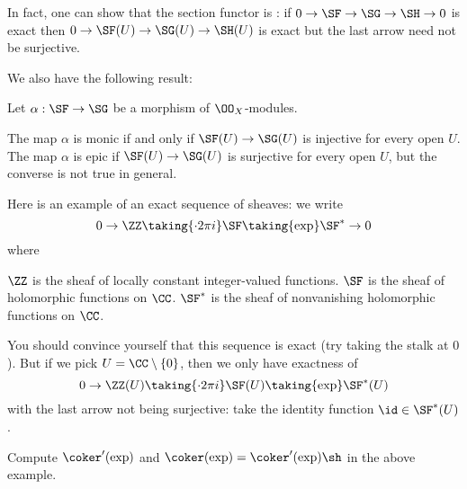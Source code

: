 \begin{remark}
	In fact, one can show that the section functor is :
	if $0 \to \SF \to \SG \to \SH \to 0$ is exact then
	$0 \to \SF(U) \to \SG(U) \to \SH(U)$ is exact but the
	last arrow need not be surjective.
\end{remark}

We also have the following result:
\begin{theorem}
	Let $\alpha : \SF \to \SG$ be a morphism of $\OO_X$-modules.
	\begin{enumerate}[(a)]
		\ii The map $\alpha$ is monic if and only if $\SF(U) \to \SG(U)$
		is injective for every open $U$.
		\ii The map $\alpha$ is epic if $\SF(U) \to \SG(U)$
		is surjective for every open $U$,
		but the converse is not true in general.
	\end{enumerate}
\end{theorem}

\begin{example}
	Here is an example of an exact sequence of sheaves:
	we write
	\[ 0 \to \ZZ \taking{\cdot 2\pi i} \SF \taking{\exp} \SF^\ast \to 0 \]
	where
	\begin{itemize}
		\ii $\ZZ$ is the sheaf of locally constant integer-valued functions.
		\ii $\SF$ is the sheaf of holomorphic functions on $\CC$.
		\ii $\SF^\ast$ is the sheaf of nonvanishing
			holomorphic functions on $\CC$.
	\end{itemize}
	You should convince yourself that this sequence is exact
	(try taking the stalk at $0$).
	But if we pick $U = \CC \setminus \{0\}$, then we only have exactness of
	\[ 0 \to \ZZ(U) \taking{\cdot 2\pi i} \SF(U) \taking{\exp} \SF^\ast(U) \]
	with the last arrow not being surjective:
	take the identity function $\id \in \SF^\ast(U)$.
\end{example}
\begin{exercise}
	Compute $\coker'(\exp)$ and $\coker(\exp) = \coker'(\exp)\sh$
	in the above example.
\end{exercise}

